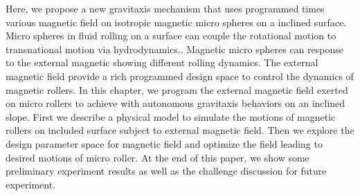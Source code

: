 Here, we propose a new gravitaxis mechanism that uses programmed times various magnetic field on isotropic magnetic micro spheres on a inclined surface. Micro spheres in fluid rolling on a surface can couple the rotational motion to transnational motion via hydrodynamics.\cite{galvin2001time,rashidi2016theoretical}. Magnetic micro spheres can response to the external  magnetic showing different rolling dynamics. \cite{helgesen2019propulsion,helgesen2018magnetic}
The external magnetic field provide a rich programmed design space to control the dynamics of magnetic rollers.
In this chapter, we program the external magnetic field exerted on  micro rollers to achieve  with autonomous gravitaxis behaviors on an inclined slope. First we describe a physical model to simulate the motions of magnetic rollers on included surface subject to external magnetic field. Then we explore the design parameter space for magnetic field  and optimize the field leading to desired motions of  micro roller. At the end of this paper, we show some preliminary experiment results as well as the challenge discussion for future experiment. 

